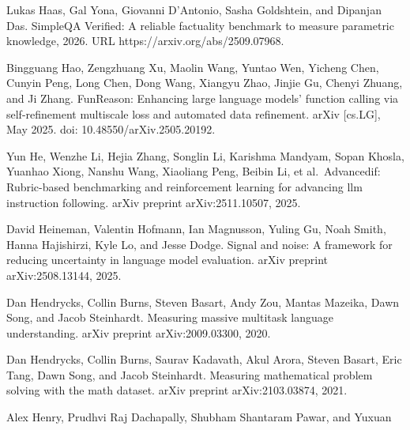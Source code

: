Lukas Haas, Gal Yona, Giovanni D'Antonio, Sasha Goldshtein, and Dipanjan
Das. SimpleQA Verified: A reliable factuality benchmark to measure
parametric knowledge, 2026. URL https://arxiv.org/abs/2509.07968.

Bingguang Hao, Zengzhuang Xu, Maolin Wang, Yuntao Wen, Yicheng Chen,
Cunyin Peng, Long Chen, Dong Wang, Xiangyu Zhao, Jinjie Gu, Chenyi
Zhuang, and Ji Zhang. FunReason: Enhancing large language models'
function calling via self-refinement multiscale loss and automated data
refinement. arXiv {[}cs.LG{]}, May 2025. doi: 10.48550/arXiv.2505.20192.

Yun He, Wenzhe Li, Hejia Zhang, Songlin Li, Karishma Mandyam, Sopan
Khosla, Yuanhao Xiong, Nanshu Wang, Xiaoliang Peng, Beibin Li, et
al.~Advancedif: Rubric-based benchmarking and reinforcement learning for
advancing llm instruction following. arXiv preprint arXiv:2511.10507,
2025.

David Heineman, Valentin Hofmann, Ian Magnusson, Yuling Gu, Noah Smith,
Hanna Hajishirzi, Kyle Lo, and Jesse Dodge. Signal and noise: A
framework for reducing uncertainty in language model evaluation. arXiv
preprint arXiv:2508.13144, 2025.

Dan Hendrycks, Collin Burns, Steven Basart, Andy Zou, Mantas Mazeika,
Dawn Song, and Jacob Steinhardt. Measuring massive multitask language
understanding. arXiv preprint arXiv:2009.03300, 2020.

Dan Hendrycks, Collin Burns, Saurav Kadavath, Akul Arora, Steven Basart,
Eric Tang, Dawn Song, and Jacob Steinhardt. Measuring mathematical
problem solving with the math dataset. arXiv preprint arXiv:2103.03874,
2021.

Alex Henry, Prudhvi Raj Dachapally, Shubham Shantaram Pawar, and Yuxuan
